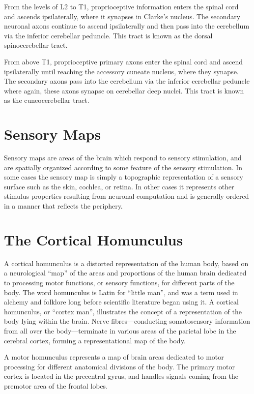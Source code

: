 From the levels of L2 to T1, proprioceptive information enters the spinal cord and ascends ipsilaterally, where it synapses in Clarke's nucleus. The secondary neuronal axons continue to ascend ipsilaterally and then pass into the cerebellum via the inferior cerebellar peduncle. This tract is known as the dorsal spinocerebellar tract.

From above T1, proprioceptive primary axons enter the spinal cord and ascend ipsilaterally until reaching the accessory cuneate nucleus, where they synapse. The secondary axons pass into the cerebellum via the inferior cerebellar peduncle where again, these axons synapse on cerebellar deep nuclei. This tract is known as the cuneocerebellar tract.

\hypertarget{sensory-maps}{%
\section{Sensory Maps}\label{sensory-maps}}

Sensory maps are areas of the brain which respond to sensory stimulation, and are spatially organized according to some feature of the sensory stimulation. In some cases the sensory map is simply a topographic representation of a sensory surface such as the skin, cochlea, or retina. In other cases it represents other stimulus properties resulting from neuronal computation and is generally ordered in a manner that reflects the periphery.

\hypertarget{the-cortical-homunculus}{%
\section{The Cortical Homunculus}\label{the-cortical-homunculus}}

A cortical homunculus is a distorted representation of the human body, based on a neurological ``map'' of the areas and proportions of the human brain dedicated to processing motor functions, or sensory functions, for different parts of the body. The word homunculus is Latin for ``little man'', and was a term used in alchemy and folklore long before scientific literature began using it. A cortical homunculus, or ``cortex man'', illustrates the concept of a representation of the body lying within the brain. Nerve fibres---conducting somatosensory information from all over the body---terminate in various areas of the parietal lobe in the cerebral cortex, forming a representational map of the body.

A motor homunculus represents a map of brain areas dedicated to motor processing for different anatomical divisions of the body. The primary motor cortex is located in the precentral gyrus, and handles signals coming from the premotor area of the frontal lobes.

